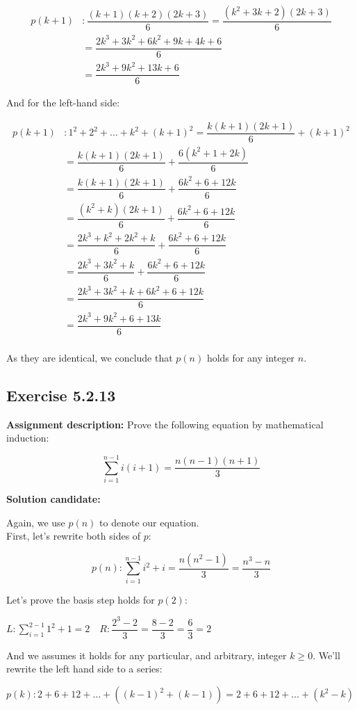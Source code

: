 \documentclass{report}
\newcommand{\cent}[1]{\begin{center}#1\end{center}}
\newcommand{\mAlign}[1]{\begin{align*}#1\end{align*}}
\newcommand{\AssignmentDescription}{\textbf{Assignment description: }}
\newcommand{\Solution}{\textbf{Solution candidate: }}
\newcommand{\QED}{\boxed{}}
\newcommand{\Exercise}[1]{\subsection{Exercise #1}}
\begin{document}
 	\mAlign{p(k+1) &:  \dfrac{(k+1)(k+2)(2k+3)}{6} = \dfrac{(k^2+3k+2)(2k+3)}{6} \\
 							&= \dfrac{2k^3+3k^2 +6k^2 +9k + 4k+6 }{6}\\
 							&= \dfrac{2k^3+9k^2 + 13k+6 }{6}}
 	
 	And for the left-hand side:
 	
 	\mAlign{
 		p(k+1) &: 1^2 + 2^2 + \dots + k^2 + (k+1)^2 = \dfrac{k(k+1)(2k+1)}{6} + (k+1)^2\\
 		&= \dfrac{k(k+1)(2k+1)}{6} + \dfrac{6(k^2 + 1 +2k)}{6} \\
 		&= \dfrac{k(k+1)(2k+1)}{6} + \dfrac{6k^2 + 6 + 12k}{6} \\
 		&= \dfrac{(k^2+k)(2k+1)}{6} + \dfrac{6k^2 + 6 + 12k}{6} \\
 		&= \dfrac{2k^3+k^2+2k^2+k}{6} + \dfrac{6k^2 + 6 + 12k}{6}\\
 		&= \dfrac{2k^3+3k^2+k}{6} + \dfrac{6k^2 + 6 + 12k}{6}\\
 		&= \dfrac{2k^3+3k^2+k + 6k^2 + 6 + 12k}{6}\\
 		&= \dfrac{2k^3+9k^2 + 6 + 13k}{6}\\
 	}
 
 	As they are identical, we conclude that $p(n)$ holds for any integer $n$.\\
 	
 	\QED
 	
 	\Exercise{5.2.13}
 	
 	\AssignmentDescription
 	Prove the following equation by mathematical induction:
 	
 	\cent{$$\sum_{i=1}^{n-1} i(i+1) = \dfrac{n(n-1)(n+1)}{3}$$}
 	
 	\Solution
 	
 	Again, we use $p(n)$ to denote our equation.\\
 	
 	First, let's rewrite both sides of $p$:
 	
 	\cent{$$p(n) :  \sum_{i=1}^{n-1} i^2+i = \dfrac{n(n^2-1)}{3} = \dfrac{n^3-n}{3}$$}
 	
 	Let's prove the basis step holds for $p(2)$:
 	
 	\cent{$ L : \sum_{i=1}^{2-1} 1^2+1 = 2 \quad R : \dfrac{2^3-2}{3} = \dfrac{8-2}{3} = \dfrac{6}{3} = 2$}
 	
 	And we assumes it holds for any particular, and arbitrary, integer $k \geq 0$. We'll rewrite the left hand side to a series:
 	
 	\cent{$p(k) : 2+6+12+ \dots + ((k-1)^2+(k-1)) = 2+6+12+ \dots + (k^2-k)$}
 	
\end{document}
